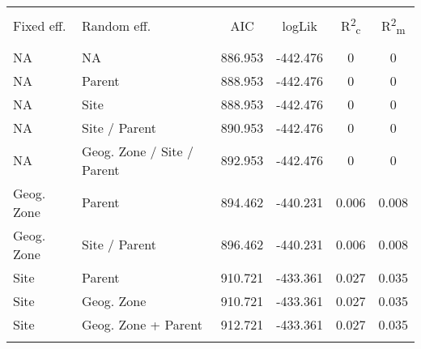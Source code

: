 
\begin{table}[!htbp] \centering 
  \caption{} 
  \label{binom_comp} 
\begin{tabular}{@{\extracolsep{5pt}} llS[table-format=3.2]S[table-format=3.2]S[table-format=3.2]S[table-format=3.2]} 
\\[-1.8ex]\hline 
\hline \\[-1.8ex] 
{Fixed eff.} & {Random eff.} & {AIC} & {logLik} & {R\textsuperscript{2}\textsubscript{c}} & {R\textsuperscript{2}\textsubscript{m}} \\
\hline \\[-1.8ex] 
NA & NA & 886.953 & -442.476 & 0 & 0 \\ 
NA & Parent & 888.953 & -442.476 & 0 & 0 \\ 
NA & Site & 888.953 & -442.476 & 0 & 0 \\ 
NA & Site / Parent & 890.953 & -442.476 & 0 & 0 \\ 
NA & Geog. Zone / Site / Parent & 892.953 & -442.476 & 0 & 0 \\ 
Geog. Zone & Parent & 894.462 & -440.231 & 0.006 & 0.008 \\ 
Geog. Zone & Site / Parent & 896.462 & -440.231 & 0.006 & 0.008 \\ 
Site & Parent & 910.721 & -433.361 & 0.027 & 0.035 \\ 
Site & Geog. Zone & 910.721 & -433.361 & 0.027 & 0.035 \\ 
Site & Geog. Zone + Parent & 912.721 & -433.361 & 0.027 & 0.035 \\ 
\hline \\[-1.8ex] 
\end{tabular} 
\end{table} 
